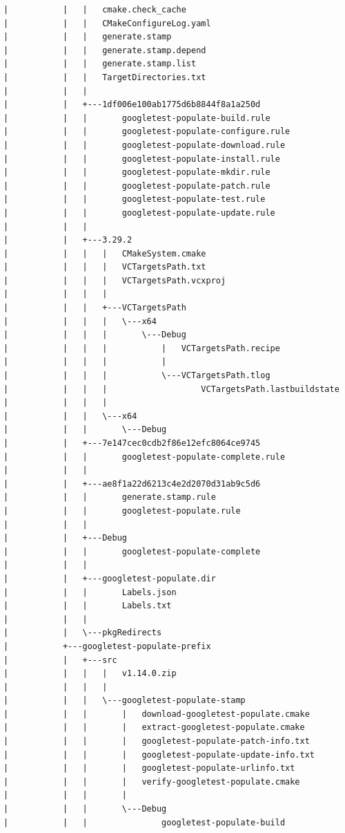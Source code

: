 \documentclass[a4paper,12pt]{article}
\begin{document}
\begin{verbatim}
|           |   |   cmake.check_cache
|           |   |   CMakeConfigureLog.yaml
|           |   |   generate.stamp
|           |   |   generate.stamp.depend
|           |   |   generate.stamp.list
|           |   |   TargetDirectories.txt
|           |   |   
|           |   +---1df006e100ab1775d6b8844f8a1a250d
|           |   |       googletest-populate-build.rule
|           |   |       googletest-populate-configure.rule
|           |   |       googletest-populate-download.rule
|           |   |       googletest-populate-install.rule
|           |   |       googletest-populate-mkdir.rule
|           |   |       googletest-populate-patch.rule
|           |   |       googletest-populate-test.rule
|           |   |       googletest-populate-update.rule
|           |   |       
|           |   +---3.29.2
|           |   |   |   CMakeSystem.cmake
|           |   |   |   VCTargetsPath.txt
|           |   |   |   VCTargetsPath.vcxproj
|           |   |   |   
|           |   |   +---VCTargetsPath
|           |   |   |   \---x64
|           |   |   |       \---Debug
|           |   |   |           |   VCTargetsPath.recipe
|           |   |   |           |   
|           |   |   |           \---VCTargetsPath.tlog
|           |   |   |                   VCTargetsPath.lastbuildstate
|           |   |   |                   
|           |   |   \---x64
|           |   |       \---Debug
|           |   +---7e147cec0cdb2f86e12efc8064ce9745
|           |   |       googletest-populate-complete.rule
|           |   |       
|           |   +---ae8f1a22d6213c4e2d2070d31ab9c5d6
|           |   |       generate.stamp.rule
|           |   |       googletest-populate.rule
|           |   |       
|           |   +---Debug
|           |   |       googletest-populate-complete
|           |   |       
|           |   +---googletest-populate.dir
|           |   |       Labels.json
|           |   |       Labels.txt
|           |   |       
|           |   \---pkgRedirects
|           +---googletest-populate-prefix
|           |   +---src
|           |   |   |   v1.14.0.zip
|           |   |   |   
|           |   |   \---googletest-populate-stamp
|           |   |       |   download-googletest-populate.cmake
|           |   |       |   extract-googletest-populate.cmake
|           |   |       |   googletest-populate-patch-info.txt
|           |   |       |   googletest-populate-update-info.txt
|           |   |       |   googletest-populate-urlinfo.txt
|           |   |       |   verify-googletest-populate.cmake
|           |   |       |   
|           |   |       \---Debug
|           |   |               googletest-populate-build

\end{verbatim}
\end{document}
